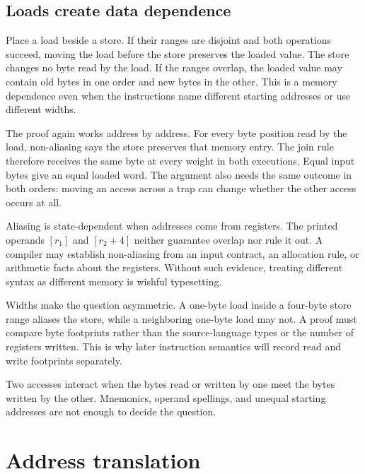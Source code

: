 \subsection{Loads create data dependence}

Place a load beside a store. If their ranges are disjoint and both operations
succeed, moving the load before the store preserves the loaded value. The
store changes no byte read by the load. If the ranges overlap, the loaded
value may contain old bytes in one order and new bytes in the other. This is a
memory dependence even when the instructions name different starting
addresses or use different widths.

The proof again works address by address. For every byte position read by the
load, non-aliasing says the store preserves that memory entry. The join rule
therefore receives the same byte at every weight in both executions. Equal
input bytes give an equal loaded word. The argument also needs the same
outcome in both orders: moving an access across a trap can change whether the
other access occurs at all.

Aliasing is state-dependent when addresses come from registers. The printed
operands \([r_1]\) and \([r_2+4]\) neither guarantee overlap nor rule it out.
A compiler may establish non-aliasing from an input contract, an allocation
rule, or arithmetic facts about the registers. Without such evidence, treating
different syntax as different memory is wishful typesetting.

Widths make the question asymmetric. A one-byte load inside a four-byte store
range aliases the store, while a neighboring one-byte load may not. A proof
must compare byte footprints rather than the source-language types or the
number of registers written. This is why later instruction semantics will
record read and write footprints separately.

\begin{keyidea}[title={Memory dependence follows byte footprints}]
Two accesses interact when the bytes read or written by one meet the bytes
written by the other. Mnemonics, operand spellings, and unequal starting
addresses are not enough to decide the question.
\end{keyidea}

\section{Address translation}

